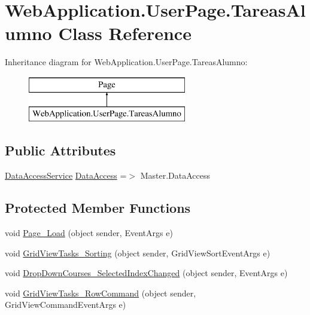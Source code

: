 \hypertarget{classWebApplication_1_1UserPage_1_1TareasAlumno}{}\section{Web\+Application.\+User\+Page.\+Tareas\+Alumno Class Reference}
\label{classWebApplication_1_1UserPage_1_1TareasAlumno}
Inheritance diagram for Web\+Application.\+User\+Page.\+Tareas\+Alumno\+:\begin{figure}[H]
\begin{center}
\leavevmode
\includegraphics[height=2.000000cm]{d8/d0a/classWebApplication_1_1UserPage_1_1TareasAlumno}
\end{center}
\end{figure}
\subsection*{Public Attributes}
\begin{DoxyCompactItemize}
\item 
\mbox{\hyperlink{classDataBaseAccess_1_1DataAccessService}{Data\+Access\+Service}} \mbox{\hyperlink{classWebApplication_1_1UserPage_1_1TareasAlumno_a63b4d6c345c2df409f3119583bf39039}{Data\+Access}} =$>$ Master.\+Data\+Access
\end{DoxyCompactItemize}
\subsection*{Protected Member Functions}
\begin{DoxyCompactItemize}
\item 
void \mbox{\hyperlink{classWebApplication_1_1UserPage_1_1TareasAlumno_a84541b38d186ebdbd9e5057e66f12360}{Page\+\_\+\+Load}} (object sender, Event\+Args e)
\item 
void \mbox{\hyperlink{classWebApplication_1_1UserPage_1_1TareasAlumno_ad5e4de37a8532e39a243840ced95ba6d}{Grid\+View\+Tasks\+\_\+\+Sorting}} (object sender, Grid\+View\+Sort\+Event\+Args e)
\item 
void \mbox{\hyperlink{classWebApplication_1_1UserPage_1_1TareasAlumno_a4a7bfe1dbd97f8cdaa6634c0c9fc3e91}{Drop\+Down\+Courses\+\_\+\+Selected\+Index\+Changed}} (object sender, Event\+Args e)
\item 
void \mbox{\hyperlink{classWebApplication_1_1UserPage_1_1TareasAlumno_a1ec6db1595f25c6e457c8614c1cee735}{Grid\+View\+Tasks\+\_\+\+Row\+Command}} (object sender, Grid\+View\+Command\+Event\+Args e)
\end{DoxyCompactItemize}
